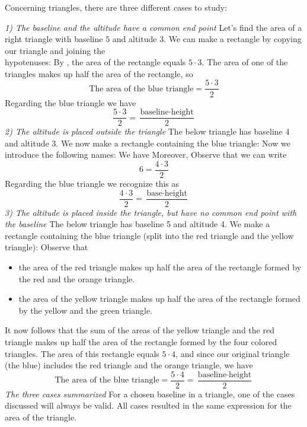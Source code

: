 \subsubsection{\artri \label{artri}}
Concerning triangles, there are three different cases to study: \vsk

\textit{1) The baseline and the altitude have a common end point} \os
Let's find the area of a right triangle with baseline $ 5 $ and altitude $ 3 $.
We can make a rectangle by copying our triangle and joining the \\hypotenuses:
By , the area of the rectangle equals $ {5\cdot 3} $. The area of one of the triangles makes up half the area of the rectangle, so
\[ \text{The area of the blue triangle} = \frac{5\cdot 3}{2} \]
Regarding the blue triangle we have
\[\frac{5\cdot3}{2}= \frac{\text{baseline}\cdot \text{height}}{2} \]
\newpage
\textit{2) The altitude is placed outside the triangle} \os
The below triangle has baseline 4 and altitude 3. 
We now make a rectangle containing the blue triangle:
Now we introduce the following names:
We have
Moreover,
Observe that we can write
\[ 6=\frac{4\cdot3}{2} \]
Regarding the blue triangle we recognize this as 
\[ \frac{4\cdot3}{2}=\frac{\text{base}\cdot\text{height}}{2} \]
\newpage
\textit{3) The altitude is placed inside the triangle, but have no common end point with the baseline} \os
The below triangle has baseline 5 and altitude 4.
We make a rectangle containing the blue triangle (split into the red triangle and the yellow triangle):
Observe that
\begin{itemize}
	\item the area of the red triangle makes up half the area of the rectangle formed by the red and the orange triangle.
	\item the area of the yellow triangle makes up half the area of the rectangle formed by the yellow and the green triangle.
\end{itemize}
It now follows that the sum of the areas of the yellow triangle and the red triangle makes up half the area of the rectangle formed by the four colored triangles. The area of this rectangle equals $ 5\cdot4 $, and since our original triangle (the blue) includes the red triangle and the orange triangle, we have
\[ \text{The area of the blue triangle}=\frac{5\cdot4}{2}=\frac{\text{baseline}\cdot\text{height}}{2} \] 
\newpage
\textit{The three cases summarized}\os
For a chosen baseline in a triangle, one of the cases discussed will always be valid. All cases resulted in the same expression for the area of the triangle.\regv

